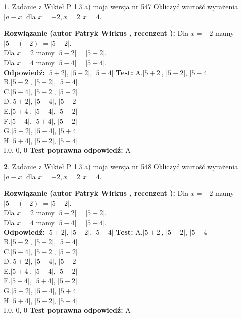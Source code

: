 \documentclass[12pt, a4paper]{article}
\theoremstyle{definition} %
\newtheorem{zad}{}
\newcommand{\zadStart}[1]{\begin{zad}#1\newline}
\newcommand{\zadStop}{\end{zad}}
\newcommand{\rozwStart}[2]{\noindent \textbf{Rozwiązanie (autor #1 , recenzent #2): }\newline}
\newcommand{\rozwStop}{\newline}
\newcommand{\odpStart}{\noindent \textbf{Odpowiedź:}\newline}
\newcommand{\odpStop}{\newline}
\newcommand{\testStart}{\noindent \textbf{Test:}\newline}
\newcommand{\testStop}{\newline}
\newcommand{\kluczStart}{\noindent \textbf{Test poprawna odpowiedź:}\newline}
\newcommand{\kluczStop}{\newline}
\begin{document}
\zadStart{Zadanie z Wikieł P 1.3 a) moja wersja nr 547}
Obliczyć wartość wyrażenia $|a - x|$ dla $x=-2,x=2,x=4$.
\zadStop
\rozwStart{Patryk Wirkus}{}
Dla $x = -2$ mamy $|5 - (-2)| = |5 + 2|$.\\
Dla $x = 2$ mamy $|5 - 2| = |5 - 2|$.\\
Dla $x = 4$ mamy $|5 - 4| = |5 - 4|$.\\
\rozwStop
\odpStart
$|5 + 2|$, $|5 - 2|$, $|5 - 4|$
\odpStop
\testStart
A.$|5 + 2|$, $|5 - 2|$, $|5 - 4|$\\
B.$|5 - 2|$, $|5 + 2|$, $|5 - 4|$\\
C.$|5 - 4|$, $|5 - 2|$, $|5 + 2|$\\
D.$|5 + 2|$, $|5 - 4|$, $|5 - 2|$\\
E.$|5 + 4|$, $|5 - 4|$, $|5 - 2|$\\
F.$|5 - 4|$, $|5 + 4|$, $|5 - 2|$\\
G.$|5 - 2|$, $|5 - 4|$, $|5 + 4|$\\
H.$|5 + 4|$, $|5 - 2|$, $|5 - 4|$\\
I.$0$, $0$, $0$
\testStop
\kluczStart
A
\kluczStop



\zadStart{Zadanie z Wikieł P 1.3 a) moja wersja nr 548}
Obliczyć wartość wyrażenia $|a - x|$ dla $x=-2,x=2,x=4$.
\zadStop
\rozwStart{Patryk Wirkus}{}
Dla $x = -2$ mamy $|5 - (-2)| = |5 + 2|$.\\
Dla $x = 2$ mamy $|5 - 2| = |5 - 2|$.\\
Dla $x = 4$ mamy $|5 - 4| = |5 - 4|$.\\
\rozwStop
\odpStart
$|5 + 2|$, $|5 - 2|$, $|5 - 4|$
\odpStop
\testStart
A.$|5 + 2|$, $|5 - 2|$, $|5 - 4|$\\
B.$|5 - 2|$, $|5 + 2|$, $|5 - 4|$\\
C.$|5 - 4|$, $|5 - 2|$, $|5 + 2|$\\
D.$|5 + 2|$, $|5 - 4|$, $|5 - 2|$\\
E.$|5 + 4|$, $|5 - 4|$, $|5 - 2|$\\
F.$|5 - 4|$, $|5 + 4|$, $|5 - 2|$\\
G.$|5 - 2|$, $|5 - 4|$, $|5 + 4|$\\
H.$|5 + 4|$, $|5 - 2|$, $|5 - 4|$\\
I.$0$, $0$, $0$
\testStop
\kluczStart
A
\kluczStop
\end{document}
